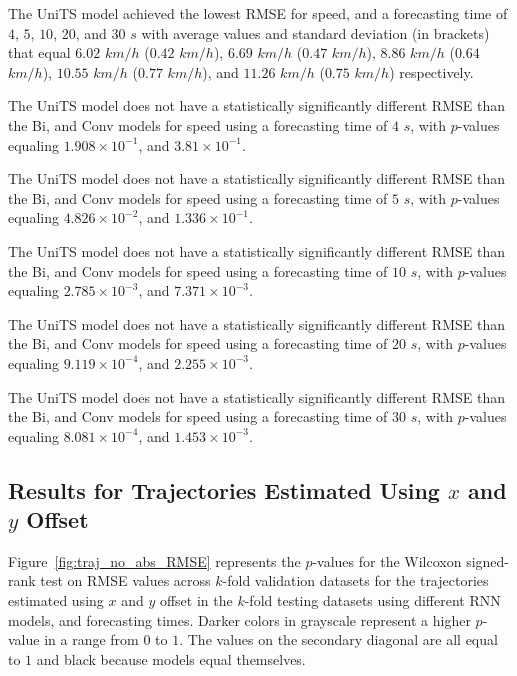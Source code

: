 The UniTS model achieved the lowest RMSE for speed, and a forecasting time of $4$, $5$, $10$, $20$, and $30$ $s$ with average values and standard deviation (in brackets) that equal $6.02$ $km/h$ ($0.42$ $km/h$), $6.69$ $km/h$ ($0.47$ $km/h$), $8.86$ $km/h$ ($0.64$ $km/h$), $10.55$ $km/h$ ($0.77$ $km/h$), and $11.26$ $km/h$ ($0.75$ $km/h$) respectively.

The UniTS model does not have a statistically significantly different RMSE than the Bi, and Conv models for speed using a forecasting time of $4$ $s$, with $p$-values equaling $1.908 \times 10^{-1}$, and $3.81 \times 10^{-1}$.

The UniTS model does not have a statistically significantly different RMSE than the Bi, and Conv models for speed using a forecasting time of $5$ $s$, with $p$-values equaling $4.826 \times 10^{-2}$, and $1.336 \times 10^{-1}$.

The UniTS model does not have a statistically significantly different RMSE than the Bi, and Conv models for speed using a forecasting time of $10$ $s$, with $p$-values equaling $2.785 \times 10^{-3}$, and $7.371 \times 10^{-3}$.

The UniTS model does not have a statistically significantly different RMSE than the Bi, and Conv models for speed using a forecasting time of $20$ $s$, with $p$-values equaling $9.119 \times 10^{-4}$, and $2.255 \times 10^{-3}$.

The UniTS model does not have a statistically significantly different RMSE than the Bi, and Conv models for speed using a forecasting time of $30$ $s$, with $p$-values equaling $8.081 \times 10^{-4}$, and $1.453 \times 10^{-3}$.

\subsection{Results for Trajectories Estimated Using $x$ and $y$ Offset}

Figure~\ref{fig:traj_no_abs_RMSE} represents the $p$-values for the Wilcoxon signed-rank test on RMSE values across $k$-fold validation datasets for the trajectories estimated using $x$ and $y$ offset in the $k$-fold testing datasets using different RNN models, and forecasting times. Darker colors in grayscale represent a higher $p$-value in a range from $0$ to $1$. The values on the secondary diagonal are all equal to $1$ and black because models equal themselves.

